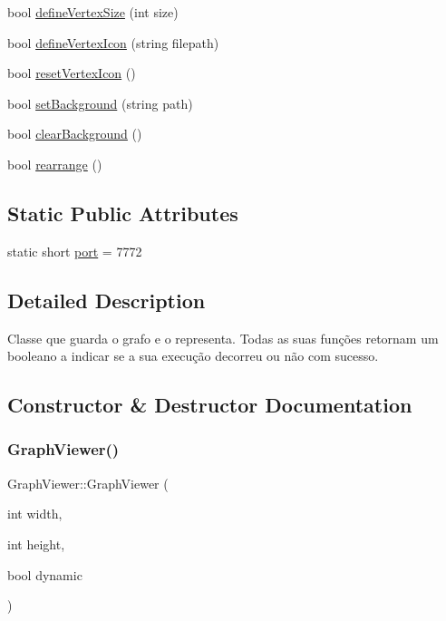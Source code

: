 \begin{DoxyCompactItemize}
\item 
bool \hyperlink{class_graph_viewer_ac4b2a9fec74d38e64088aa79ca4b7d9b}{define\+Vertex\+Size} (int size)
\item 
bool \hyperlink{class_graph_viewer_af1adb6a361457187a820e01dcf0a34b7}{define\+Vertex\+Icon} (string filepath)
\item 
bool \hyperlink{class_graph_viewer_ae2b602cfdfb49ec0a67f2bcd11b0fbdb}{reset\+Vertex\+Icon} ()
\item 
bool \hyperlink{class_graph_viewer_a02437b5fecd8b90de24436068312d593}{set\+Background} (string path)
\item 
bool \hyperlink{class_graph_viewer_a5a03467a98312f2fef5b337677b104a8}{clear\+Background} ()
\item 
bool \hyperlink{class_graph_viewer_a3009a66958686ccb7e78b68e37c3c423}{rearrange} ()
\end{DoxyCompactItemize}
\subsection*{Static Public Attributes}
\begin{DoxyCompactItemize}
\item 
static short \hyperlink{class_graph_viewer_a89d0abe75f41feededc49497cc514342}{port} = 7772
\end{DoxyCompactItemize}


\subsection{Detailed Description}
Classe que guarda o grafo e o representa. Todas as suas funções retornam um booleano a indicar se a sua execução decorreu ou não com sucesso. 

\subsection{Constructor \& Destructor Documentation}
\mbox{\label{class_graph_viewer_a8adc614f4fc290a3efcec7d7ceb1c58a}} 
\subsubsection{\texorpdfstring{Graph\+Viewer()}{GraphViewer()}\hspace{0.1cm}{\footnotesize\ttfamily [1/2]}}
{\footnotesize\ttfamily Graph\+Viewer\+::\+Graph\+Viewer (\begin{DoxyParamCaption}\item[{int}]{width,  }\item[{int}]{height,  }\item[{bool}]{dynamic }\end{DoxyParamCaption})}

